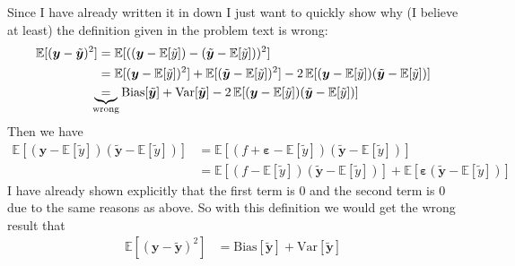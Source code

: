 \documentclass{article}
\begin{document}
	Since I have already written it in down I just want to quickly show why (I believe at least) the definition given in the problem text is wrong:
	\begin{align*}
		\mathbb{E}[(\bm y-\tilde{\bm y})^2]&=\mathbb{E}[((\bm y-\mathbb{E}[\tilde y])-(\tilde{\bm y}-\mathbb{E}[\tilde y]))^2]\\
		&=\mathbb{E}[(\bm y-\mathbb{E}[\tilde y])^2]+\mathbb{E}[(\tilde{\bm y}-\mathbb{E}[\tilde y])^2]-2\,\mathbb{E}[(\bm y-\mathbb{E}[\tilde y])(\tilde{\bm y}-\mathbb{E}[\tilde y])]\\
		&\hspace{-2mm}\underbrace{=}_{\text{wrong}}\text{Bias}[\tilde{\bm y}]+\text{Var}[\tilde{\bm y}]-2\,\mathbb{E}[(\bm y-\mathbb{E}[\tilde y])(\tilde{\bm y}-\mathbb{E}[\tilde y])]
	\end{align*}
	Then we have
	\begin{align*}
		\mathbb{E}[(\bm y-\mathbb{E}[\tilde y])(\tilde{\bm y}-\mathbb{E}[\tilde y])]&=\mathbb{E}[(f+\bm\varepsilon-\mathbb{E}[\tilde y])(\tilde{\bm y}-\mathbb{E}[\tilde y])]\\
		&=\mathbb{E}[(f-\mathbb{E}[\tilde y])(\tilde{\bm y}-\mathbb{E}[\tilde y])]+\mathbb{E}[\bm\varepsilon(\tilde{\bm y}-\mathbb{E}[\tilde y])]
	\end{align*}
	I have already shown explicitly that the first term is $0$ and the second term is 0 due to the same reasons as above. So with this definition we would get the wrong result that
	\begin{align*}
		\mathbb{E}[(\bm y-\tilde{\bm y})^2]&=\text{Bias}[\tilde{\bm y}]+\text{Var}[\tilde{\bm y}]
	\end{align*}
	
		
\end{document}
